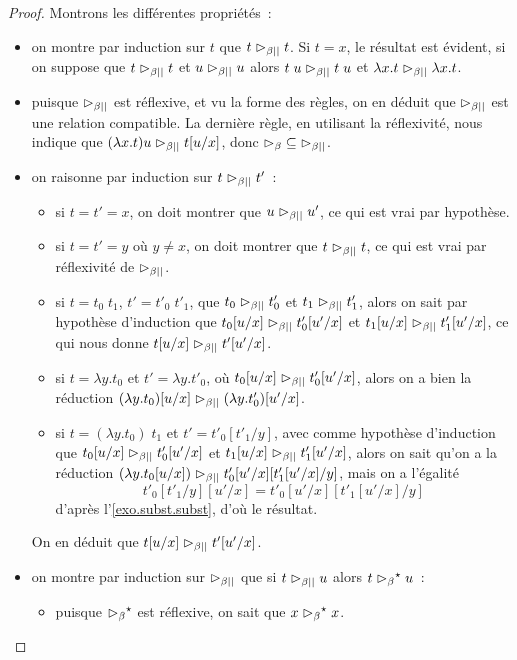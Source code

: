 \begin{proof}
  Montrons les différentes propriétés~:
  \begin{itemize}
  \item on montre par induction sur $t$ que $t\redPar t$. Si $t = x$, le
    résultat est évident, si on suppose que $t\redPar t$ et $u\redPar u$
    alors $t\;u\redPar t\;u$ et $\lambda x.t\redPar \lambda x.t$.
  \item puisque $\redPar$ est réflexive, et vu la forme des règles, on en
    déduit que $\redPar$ est une relation compatible. La dernière règle,
    en utilisant la réflexivité, nous indique que
    $(\lambda x.t)u\redPar t[u/x]$, donc
    $\mathord{\bred}\subseteq \mathord{\redPar}$.
  \item on raisonne par induction sur $t\redPar t'$~:
    \begin{itemize}
    \item si $t = t' = x$, on doit montrer que $u \redPar u'$, ce qui est vrai
      par hypothèse.
    \item si $t = t' = y$ où $y \neq x$, on doit montrer que $t \redPar t$,
      ce qui est vrai par réflexivité de $\redPar$.
    \item si $t = t_0\;t_1$, $t' = t'_0\;t'_1$, que $t_0 \redPar t'_0$ et
      $t_1\redPar t'_1$, alors on sait par hypothèse d'induction que
      $t_0[u/x] \redPar t'_0[u'/x]$ et $t_1[u/x] \redPar t'_1[u'/x]$, ce qui
      nous donne $t[u/x] \redPar t'[u'/x]$.
    \item si $t = \lambda y.t_0$ et $t' = \lambda y.t'_0$, où
      $t_0[u/x]\redPar t'_0[u'/x]$, alors on a bien la réduction
      $(\lambda y.t_0)[u/x] \redPar (\lambda y.t'_0)[u'/x]$.
    \item si $t = (\lambda y.t_0)\;t_1$ et $t' = t'_0[t'_1/y]$, avec comme
      hypothèse d'induction que $t_0[u/x]\redPar t'_0[u'/x]$ et
      $t_1[u/x]\redPar t'_1[u'/x]$, alors on sait qu'on a la réduction
      $(\lambda y.t_0[u/x]) \redPar t'_0[u'/x][t'_1[u'/x]/y]$, mais on a
      l'égalité
      \[t'_0[t'_1/y][u'/x] = t'_0[u'/x][t'_1[u'/x]/y]\]
      d'après l'\cref{exo.subst.subst}, d'où le résultat.
    \end{itemize}
    On en déduit que $t[u/x] \redPar t'[u'/x]$.
  \item on montre par induction sur $\redPar$ que si $t\redPar u$ alors
    $t\rtClot{\bred} u$~:
    \begin{itemize}
    \item puisque $\rtClot{\bred}$ est réflexive, on sait que
      $x\rtClot{\bred} x$.

\end{itemize}
\end{itemize}
\end{proof}
